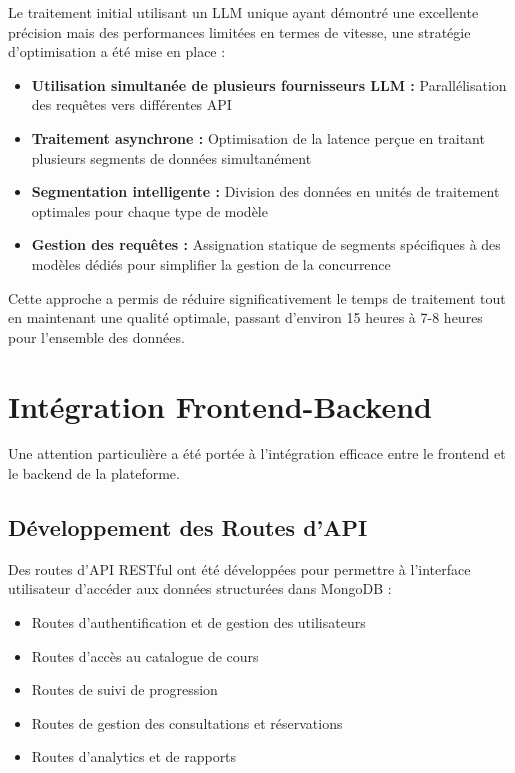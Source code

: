 Le traitement initial utilisant un LLM unique ayant démontré une excellente précision mais des performances limitées en termes de vitesse, une stratégie d'optimisation a été mise en place :

\begin{itemize}
  \item \textbf{Utilisation simultanée de plusieurs fournisseurs LLM :} Parallélisation des requêtes vers différentes API
  \item \textbf{Traitement asynchrone :} Optimisation de la latence perçue en traitant plusieurs segments de données simultanément
  \item \textbf{Segmentation intelligente :} Division des données en unités de traitement optimales pour chaque type de modèle
  \item \textbf{Gestion des requêtes :} Assignation statique de segments spécifiques à des modèles dédiés pour simplifier la gestion de la concurrence
\end{itemize}

Cette approche a permis de réduire significativement le temps de traitement tout en maintenant une qualité optimale, passant d'environ 15 heures à 7-8 heures pour l'ensemble des données.

\section{Intégration Frontend-Backend}

Une attention particulière a été portée à l'intégration efficace entre le frontend et le backend de la plateforme.

\subsection{Développement des Routes d'API}

Des routes d'API RESTful ont été développées pour permettre à l'interface utilisateur d'accéder aux données structurées dans MongoDB :

\begin{itemize}
  \item Routes d'authentification et de gestion des utilisateurs
  \item Routes d'accès au catalogue de cours
  \item Routes de suivi de progression
  \item Routes de gestion des consultations et réservations
  \item Routes d'analytics et de rapports
\end{itemize}

